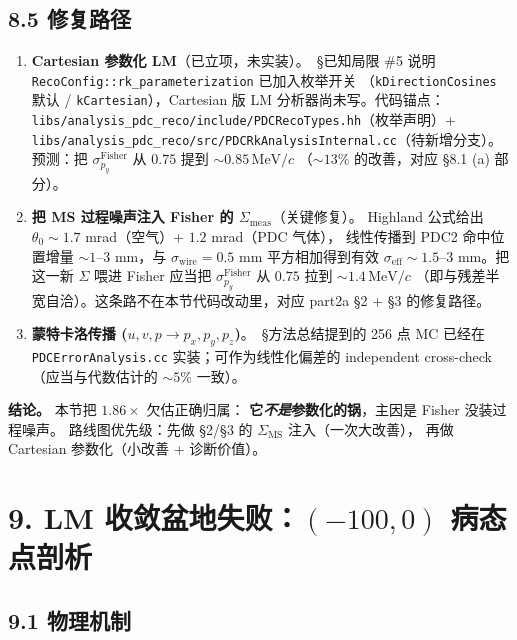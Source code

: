 \subsection*{8.5 修复路径}

\begin{enumerate}
  \item \textbf{Cartesian 参数化 LM}（已立项，未实装）。\StatusReport{}~§已知局限 \#5
        说明 \texttt{RecoConfig::rk\_parameterization} 已加入枚举开关
        （\texttt{kDirectionCosines} 默认 / \texttt{kCartesian}），Cartesian 版 LM
        分析器尚未写。代码锚点：\texttt{libs/analysis\_pdc\_reco/include/PDCRecoTypes.hh}（枚举声明）+
        \texttt{libs/analysis\_pdc\_reco/src/PDCRkAnalysisInternal.cc}（待新增分支）。
        预测：把 $\sigma_{p_y}^\mathrm{Fisher}$ 从 $0.75$ 提到 $\sim 0.85\,\mathrm{MeV}/c$
        （$\sim 13\%$ 的改善，对应 §8.1 (a) 部分）。
  \item \textbf{把 MS 过程噪声注入 Fisher 的 $\Sigma_\mathrm{meas}$}（关键修复）。
        Highland 公式给出 $\theta_0 \sim 1.7$ mrad（空气）+ $1.2$ mrad（PDC 气体），
        线性传播到 PDC2 命中位置增量 $\sim 1$--3 mm，与 $\sigma_\mathrm{wire}=0.5$ mm
        平方相加得到有效 $\sigma_\mathrm{eff} \sim 1.5$--3 mm。把这一新 $\Sigma$ 喂进
        Fisher 应当把 $\sigma_{p_y}^\mathrm{Fisher}$ 从 $0.75$ 拉到 $\sim 1.4\,\mathrm{MeV}/c$
        （即与残差半宽自洽）。这条路不在本节代码改动里，对应 part2a §2 + §3 的修复路径。
  \item \textbf{蒙特卡洛传播 ($u,v,p\to p_x,p_y,p_z$)}。\StatusReport{}~§方法总结提到的
        256 点 MC 已经在 \texttt{PDCErrorAnalysis.cc} 实装；可作为线性化偏差的
        independent cross-check（应当与代数估计的 $\sim 5\%$ 一致）。
\end{enumerate}

\textbf{结论。} 本节把 $1.86\times$ 欠估正确归属：
\textbf{它\emph{不是}参数化的锅}，主因是 Fisher 没装过程噪声。
路线图优先级：先做 §2/§3 的 $\Sigma_\mathrm{MS}$ 注入（一次大改善），
再做 Cartesian 参数化（小改善 + 诊断价值）。

\section{9. LM 收敛盆地失败：\texorpdfstring{$(-100, 0)$}{(-100,0)} 病态点剖析}
\label{sec:partIIc:budget:lm-basin}

\subsection*{9.1 物理机制}

